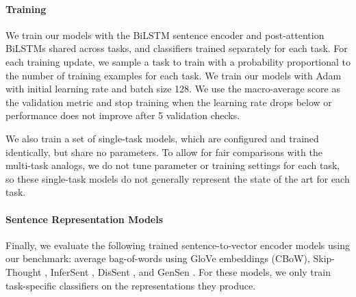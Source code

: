 \documentclass{article} \usepackage{iclr2019_conference,times}
\begin{document}
\paragraph{Training}

We train our models with the BiLSTM sentence encoder and post-attention BiLSTMs shared across tasks, and classifiers trained separately for each task.
For each training update, we sample a task to train with a probability proportional to the number of training examples for each task.
We train our models with Adam \citep{kingma2014adam} with initial learning rate  and batch size 128.
We use the macro-average score as the validation metric and stop training when the learning rate drops below  or performance does not improve after 5 validation checks.

We also train a set of single-task models, which are configured and trained identically, but share no parameters. To allow for fair comparisons with the multi-task analogs, we do not tune parameter or training settings for each task, so these single-task models do not generally represent the state of the art for each task.
 
\paragraph{Sentence Representation Models}

Finally, we evaluate the following trained sentence-to-vector encoder models using our benchmark: average bag-of-words using GloVe embeddings (CBoW), Skip-Thought \citep{kiros2015skip}, InferSent \citep{DBLP:conf/emnlp/ConneauKSBB17}, DisSent \citep{nie2017dissent}, and GenSen \citep{subramanian2018large}. 
For these models, we only train task-specific classifiers on the representations they produce. 
\end{document}
